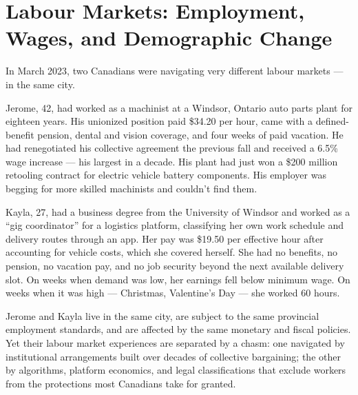 
\chapter{Labour Markets: Employment, Wages, and Demographic Change}
\label{ch:labour}


\noindent In March 2023, two Canadians were navigating very different
labour markets --- in the same city.

Jerome, 42, had worked as a machinist at a Windsor, Ontario auto parts
plant for eighteen years. His unionized position paid \$34.20 per hour,
came with a defined-benefit pension, dental and vision coverage, and
four weeks of paid vacation. He had renegotiated his collective agreement
the previous fall and received a 6.5\% wage increase --- his largest in
a decade. His plant had just won a \$200 million retooling contract for
electric vehicle battery components. His employer was begging for more
skilled machinists and couldn't find them.

Kayla, 27, had a business degree from the University of Windsor and
worked as a ``gig coordinator'' for a logistics platform, classifying
her own work schedule and delivery routes through an app. Her pay was
\$19.50 per effective hour after accounting for vehicle costs, which
she covered herself. She had no benefits, no pension, no vacation pay,
and no job security beyond the next available delivery slot. On weeks when
demand was low, her earnings fell below minimum wage. On weeks when it was
high --- Christmas, Valentine's Day --- she worked 60 hours.

Jerome and Kayla live in the same city, are subject to the same provincial
employment standards, and are affected by the same monetary and fiscal
policies. Yet their labour market experiences are separated by a chasm:
one navigated by institutional arrangements built over decades of
collective bargaining; the other by algorithms, platform economics, and
legal classifications that exclude workers from the protections most
Canadians take for granted.

